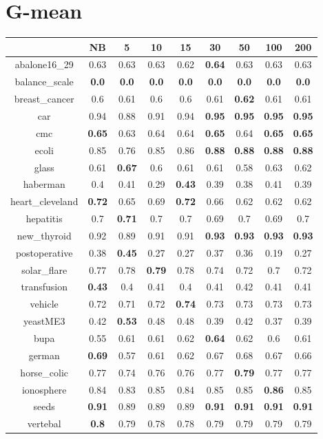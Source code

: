 \documentclass{article}%
\begin{document}
%
\section*{G{-}mean}%
\begin{tabular}{c|cccccccc}%
\hline%
&NB&5&10&15&30&50&100&200\\%
\hline%
abalone16\_29&0.63&0.63&0.63&0.62&\textbf{0.64}&0.63&0.63&0.63\\%
\hline%
balance\_scale&\textbf{0.0}&\textbf{0.0}&\textbf{0.0}&\textbf{0.0}&\textbf{0.0}&\textbf{0.0}&\textbf{0.0}&\textbf{0.0}\\%
\hline%
breast\_cancer&0.6&0.61&0.6&0.6&0.61&\textbf{0.62}&0.61&0.61\\%
\hline%
car&0.94&0.88&0.91&0.94&\textbf{0.95}&\textbf{0.95}&\textbf{0.95}&\textbf{0.95}\\%
\hline%
cmc&\textbf{0.65}&0.63&0.64&0.64&\textbf{0.65}&0.64&\textbf{0.65}&\textbf{0.65}\\%
\hline%
ecoli&0.85&0.76&0.85&0.86&\textbf{0.88}&\textbf{0.88}&\textbf{0.88}&\textbf{0.88}\\%
\hline%
glass&0.61&\textbf{0.67}&0.6&0.61&0.61&0.58&0.63&0.62\\%
\hline%
haberman&0.4&0.41&0.29&\textbf{0.43}&0.39&0.38&0.41&0.39\\%
\hline%
heart\_cleveland&\textbf{0.72}&0.65&0.69&\textbf{0.72}&0.66&0.62&0.62&0.62\\%
\hline%
hepatitis&0.7&\textbf{0.71}&0.7&0.7&0.69&0.7&0.69&0.7\\%
\hline%
new\_thyroid&0.92&0.89&0.91&0.91&\textbf{0.93}&\textbf{0.93}&\textbf{0.93}&\textbf{0.93}\\%
\hline%
postoperative&0.38&\textbf{0.45}&0.27&0.27&0.37&0.36&0.19&0.27\\%
\hline%
solar\_flare&0.77&0.78&\textbf{0.79}&0.78&0.74&0.72&0.7&0.72\\%
\hline%
transfusion&\textbf{0.43}&0.4&0.41&0.4&0.41&0.42&0.41&0.41\\%
\hline%
vehicle&0.72&0.71&0.72&\textbf{0.74}&0.73&0.73&0.73&0.73\\%
\hline%
yeastME3&0.42&\textbf{0.53}&0.48&0.48&0.39&0.42&0.37&0.39\\%
\hline%
bupa&0.55&0.61&0.61&0.62&\textbf{0.64}&0.62&0.6&0.61\\%
\hline%
german&\textbf{0.69}&0.57&0.61&0.62&0.67&0.68&0.67&0.66\\%
\hline%
horse\_colic&0.77&0.74&0.76&0.76&0.77&\textbf{0.79}&0.77&0.77\\%
\hline%
ionosphere&0.84&0.83&0.85&0.84&0.85&0.85&\textbf{0.86}&0.85\\%
\hline%
seeds&\textbf{0.91}&0.89&0.89&0.89&\textbf{0.91}&\textbf{0.91}&\textbf{0.91}&\textbf{0.91}\\%
\hline%
vertebal&\textbf{0.8}&0.79&0.78&0.78&0.79&0.79&0.79&0.79\\%
\hline%
\end{tabular}

%
\end{document}

